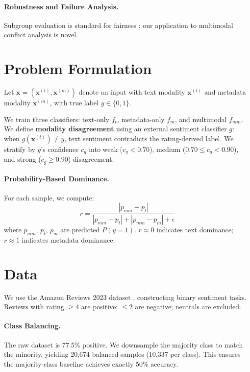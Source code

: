 \documentclass[11pt,a4paper]{article}
\begin{document}
\paragraph{Robustness and Failure Analysis.}
Subgroup evaluation is standard for fairness \citep{barocas2019fairness}; our application to multimodal conflict analysis is novel.

\section{Problem Formulation}

Let $\mathbf{x} = (\mathbf{x}^{(t)}, \mathbf{x}^{(m)})$ denote an input with text modality $\mathbf{x}^{(t)}$ and metadata modality $\mathbf{x}^{(m)}$, with true label $y \in \{0, 1\}$.

We train three classifiers: text-only $f_t$, metadata-only $f_m$, and multimodal $f_{mm}$.
We define \textbf{modality disagreement} using an external sentiment classifier $g$: when $g(\mathbf{x}^{(t)}) \neq y$, text sentiment contradicts the rating-derived label.
We stratify by $g$'s confidence $c_g$ into weak ($c_g < 0.70$), medium ($0.70 \leq c_g < 0.90$), and strong ($c_g \geq 0.90$) disagreement.

\paragraph{Probability-Based Dominance.}
For each sample, we compute:
\begin{equation}
  r = \frac{|p_{mm} - p_t|}{|p_{mm} - p_t| + |p_{mm} - p_m| + \epsilon}
\end{equation}
where $p_{mm}$, $p_t$, $p_m$ are predicted $P(y=1)$.
$r \approx 0$ indicates text dominance; $r \approx 1$ indicates metadata dominance.

\section{Data}

We use the Amazon Reviews 2023 dataset \citep{hou2024bridging}, constructing binary sentiment tasks.
Reviews with rating $\geq 4$ are positive; $\leq 2$ are negative; neutrals are excluded.

\paragraph{Class Balancing.}
The raw dataset is 77.5\% positive.
We downsample the majority class to match the minority, yielding 20{,}674 balanced samples (10{,}337 per class).
This ensures the majority-class baseline achieves exactly 50\% accuracy.
\end{document}
